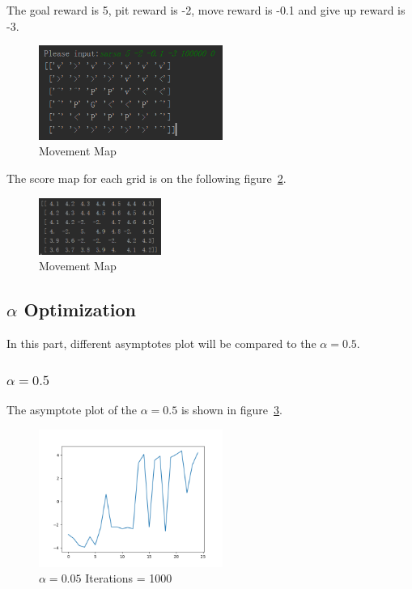 \documentclass[11pt, a4paper]{article}
\begin{document}
The goal reward is 5, pit reward is -2, move reward is -0.1 and give up reward is -3.

 \begin{figure}[htbp] 
	\begin{center}
		\includegraphics[width=6cm]{1_movement} 
		\caption{Movement Map} 
		\label{fig:1_3}
	\end{center}
\end{figure}

\newpage
The score map for each grid is on the following figure~\ref{fig:1_4}. 

\begin{figure}[htbp] 
	\begin{center}
		\includegraphics[width=4cm]{1_score} 
		\caption{Movement Map} 
		\label{fig:1_4}
	\end{center}
\end{figure}
 

\subsection{$\alpha$ Optimization}

In this part, different asymptotes plot will be compared to the $\alpha = 0.5$.

\subsubsection{$\alpha = 0.5$}

The asymptote plot of the $\alpha = 0.5$ is shown in figure~\ref{fig:2_2}. 

\begin{figure}[htbp] 
	\begin{center}
		\includegraphics[width=6cm]{2_2} 
		\caption{$\alpha = 0.05$ Iterations = 1000} 
		\label{fig:2_2}
	\end{center}
\end{figure}
\end{document}
